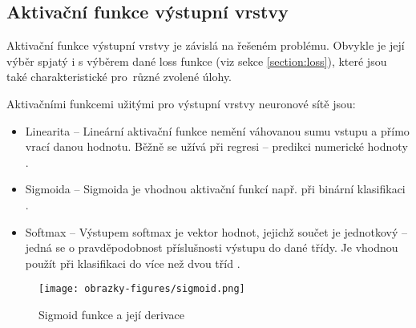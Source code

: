 \subsection{Aktivační funkce výstupní vrstvy}
Aktivační funkce výstupní vrstvy je závislá na řešeném problému. Obvykle je její výběr spjatý i s výběrem dané loss funkce (viz sekce \ref{section:loss}), které jsou také charakteristické pro~různé zvolené úlohy.

Aktivačními funkcemi užitými pro výstupní vrstvy neuronové sítě jsou:
\begin{itemize}
    \item Linearita -- Lineární aktivační funkce nemění váhovanou sumu vstupu a přímo vrací danou hodnotu. Běžně se užívá při regresi -- predikci numerické hodnoty \cite{HowToChooseActivationFunction}.
    \item Sigmoida -- Sigmoida je vhodnou aktivační funkcí např. při binární klasifikaci \cite{HowToChooseActivationFunction}.
    \item Softmax -- Výstupem softmax je vektor hodnot, jejichž součet je jednotkový -- jedná se o pravděpodobnost příslušnosti výstupu do dané třídy. Je vhodnou použít při klasifikaci do více než dvou tříd \cite{HowToChooseActivationFunction}. 
\end{itemize}

\begin{figure}[!htbp]
    \centering
    \texttt{[image: obrazky-figures/sigmoid.png]}
    \caption{Sigmoid funkce a její derivace \cite{VanishingGradientProblem}}
    \label{fig:sigmoid}
\end{figure}


